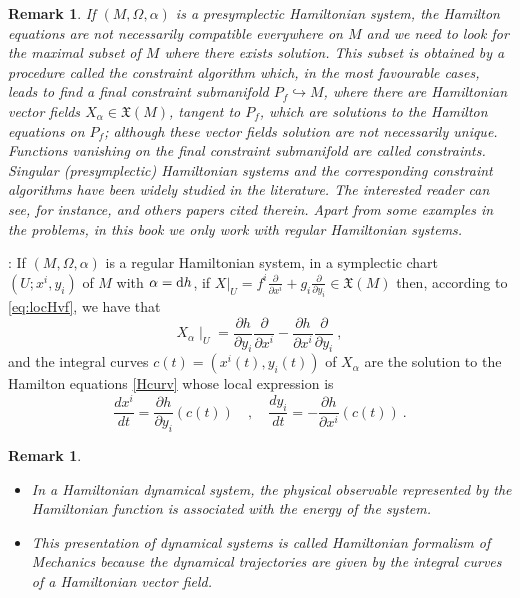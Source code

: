 \documentclass[12pt]{report}
\newtheorem{remark}[teor]{Remark}
\def\derpar#1#2{\frac{\partial{#1}}{\partial{#2}}}
\def\vf{\mathfrak X}
\def\d{{\rm d}}
\begin{document}
\bigskip
\begin{remark}{\rm 
If $(M,\Omega,\alpha)$ is a presymplectic Hamiltonian system,
the Hamilton equations are not necessarily compatible everywhere on $M$ and we need to look for the maximal subset of $M$ where there exists solution. 
This subset is obtained by a procedure called the {\sl constraint algorithm} which, in the most favourable cases, 
leads to find  a {\sl final constraint submanifold} $P_f\hookrightarrow M$, where there are Hamiltonian vector fields $X_\alpha\in\vf(M)$,
tangent to $P_f$, which are
solutions to the Hamilton equations on $P_f$; although 
these vector fields solution are not necessarily unique. 
Functions vanishing on the final constraint submanifold are called {\sl constraints}.
Singular (presymplectic) Hamiltonian systems and the corresponding constraint algorithms
have been widely studied in the literature. The interested reader can 
see, for instance, \cite{Ca-90,CGIR-85,Dir-64,GNH-78,GP-92,HRT-76,ILDM-99,MMT-97,Mu-89,Sn-74}
and others papers cited therein. Apart from some examples in the problems, 
in this book we only work with regular Hamiltonian systems. 
}\end{remark}

\bigskip
{}:
If $(M,\Omega, \alpha)$ is a regular Hamiltonian system, in a symplectic chart $(U;x^i,y_i)$ of $M$ with $\alpha=\d h$,
if $\displaystyle X\vert_U=f^i\derpar{}{x^i}+g_i\derpar{}{y_i}\in\vf (M)$
then, according to \eqref{eq:locHvf}, we have that
$$
X_{\alpha}\mid_U = \derpar{h}{y_i}\derpar{}{x^i}-\derpar{h}{x^i}\derpar{}{y_i} \ ,
$$
and the integral curves $c(t)=(x^i(t),y_i(t))$ of $X_{\alpha}$ are the solution to the Hamilton equations \eqref{Hcurv} whose local expression is
$$
\frac{d x^i}{d t} = \derpar{h}{y_i}(c(t))
\quad , \quad
\frac{d y_i}{d t} = -\derpar{h}{x^i}(c(t)) \ .
$$

\begin{remark}{\rm 
\begin{itemize}
\item
In a Hamiltonian dynamical  system,
the physical observable represented by the Hamiltonian function 
is associated with the energy of the system.
\item
This presentation of dynamical systems
is called {\sl Hamiltonian formalism of Mechanics} 
because the dynamical trajectories
are given by  the integral curves of a Hamiltonian vector field.
\end{itemize}
}\end{remark}
\end{document}
